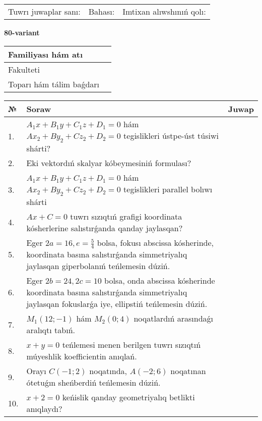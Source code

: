 \documentclass{article}
\begin{document}
\vspace{1cm}

\begin{tabular}{lll}
Tuwrı juwaplar sanı: \underline{\hspace{1.5cm}} & 
Bahası: \underline{\hspace{1.5cm}} & 
Imtixan alıwshınıń qolı: \underline{\hspace{2cm}} \\
\end{tabular}

\egroup

\newpage


\textbf{80-variant}\\

\bgroup
\def\arraystretch{1.6} %

\begin{tabular}{|m{5.7cm}|m{9.5cm}|}
\hline
Familiyası hám atı & \\
\hline
Fakulteti  & \\
\hline
Toparı hám tálim baǵdarı  & \\
\hline
\end{tabular}

\vspace{1cm}

\begin{tabular}{|m{0.7cm}|m{10cm}|m{4cm}|}
\hline
№ & Soraw & Juwap \\
\hline
1. & $A_1x+B_1y+C_1z+D_1=0$ hám $Ax_2+By_2+Cz_2+D_2=0$ tegislikleri ústpe-úst túsiwi shárti? &  \\
\hline
2. & Eki vektordıń skalyar kóbeymesiniń formulası? &  \\
\hline
3. & $A_1x+B_1y+C_1z+D_1=0$ hám $Ax_2+By_2+Cz_2+D_2=0$ tegislikleri parallel bolıwı shárti &  \\
\hline
4. & $Ax+C=0$ tuwrı sızıqtıń grafigi koordinata kósherlerine salıstırǵanda qanday jaylasqan? &  \\
\hline
5. & Eger $2a=16, e=\frac{5}{4}$ bolsa, fokusı abscissa kósherinde, koordinata basına salıstırǵanda simmetriyalıq jaylasqan giperbolanıń teńlemesin dúziń. &  \\
\hline
6. & Eger $2b=24, 2 c=10$ bolsa, onda abscissa kósherinde koordinata basına salıstırǵanda simmetriyalıq jaylasqan fokuslarǵa iye, ellipstiń teńlemesin dúziń. &  \\
\hline
7. & $M_{1} (12;-1)$ hám $M_{2} (0;4)$ noqatlardıń arasındaǵı aralıqtı tabıń. &  \\
\hline
8. & $x+y=0$ teńlemesi menen berilgen tuwrı sızıqtıń múyeshlik koefficientin anıqlań. &  \\
\hline
9. & Orayı $C (-1;2)$ noqatında, $A (-2;6 )$ noqatınan ótetuǵın sheńberdiń teńlemesin dúziń. &  \\
\hline
10. & $x+2=0$ keńislik qanday geometriyalıq betlikti anıqlaydı? &  \\
\hline
\end{tabular}
\end{document}
